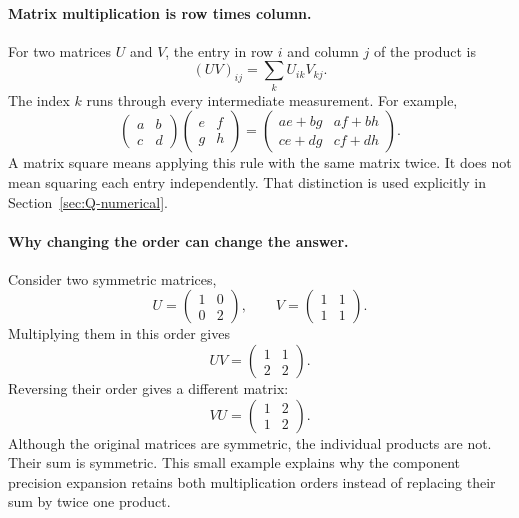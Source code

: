 \documentclass[11pt]{article}
\begin{document}
\paragraph{Matrix multiplication is row times column.}
For two matrices $U$ and $V$, the entry in row $i$ and column $j$ of the
product is
\begin{equation}
 (UV)_{ij}=\sum_k U_{ik}V_{kj}.
\end{equation}
The index $k$ runs through every intermediate measurement. For example,
\begin{equation}
 \begin{pmatrix}a&b\\c&d\end{pmatrix}
 \begin{pmatrix}e&f\\g&h\end{pmatrix}
 =\begin{pmatrix}ae+bg&af+bh\\ce+dg&cf+dh\end{pmatrix}.
\end{equation}
A matrix square means applying this rule with the same matrix twice.
It does not mean squaring each entry independently. That distinction is
used explicitly in Section~\ref{sec:Q-numerical}.

\paragraph{Why changing the order can change the answer.}
Consider two symmetric matrices,
\begin{equation}
 U=\begin{pmatrix}1&0\\0&2\end{pmatrix},
 \qquad V=\begin{pmatrix}1&1\\1&1\end{pmatrix}.
\end{equation}
Multiplying them in this order gives
\begin{equation}
 UV=\begin{pmatrix}1&1\\2&2\end{pmatrix}.
\end{equation}
Reversing their order gives a different matrix:
\begin{equation}
 VU=\begin{pmatrix}1&2\\1&2\end{pmatrix}.
\end{equation}
Although the original matrices are symmetric, the individual products
are not. Their sum is symmetric. This small example explains why the
component precision expansion retains both multiplication orders instead
of replacing their sum by twice one product.
\end{document}
